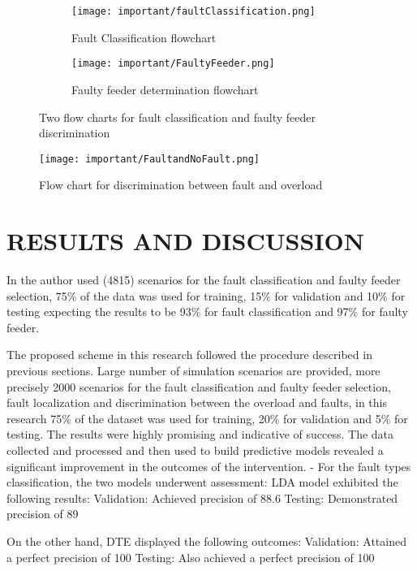 \documentclass[8pt,a4paper,oneside]{elsarticle}
\begin{document}
\begin{figure}[H]
    \centering
    \begin{subfigure}{0.5\linewidth}
        \centering
        \texttt{[image: important/faultClassification.png]}
        \caption{Fault Classification flowchart}
        \label{0_fig:13_faultClassificationFlowChart}
    \end{subfigure}%
    \begin{subfigure}{0.5\linewidth}
        \centering
        \texttt{[image: important/FaultyFeeder.png]}
        \caption{Faulty feeder determination flowchart}
        \label{0_fig:14_faultyFeederDeterminationFlowChart}
    \end{subfigure}
    \caption{Two flow charts for fault classification and faulty feeder discrimination}
\end{figure}
\begin{figure}[H]
    \centering
    \texttt{[image: important/FaultandNoFault.png]}
    \caption{Flow chart for discrimination between fault and overload }
    \label{0_figure:21_faultandNoFaultOverlOad}
\end{figure}
\section{RESULTS AND DISCUSSION}
 In \cite{hubana9066305_10} the author used (4815) scenarios for the fault
classification and faulty feeder selection, 75\% of the data
was used for training, 15\% for validation and 10\% for
testing expecting the results to be 93\% for fault
classification and 97\% for faulty feeder.

 The proposed scheme in this research followed the
procedure described in previous sections. Large number of
simulation scenarios are provided, more precisely 2000
scenarios for the fault classification and faulty feeder
selection, fault localization and discrimination between the overload and faults, in this research 75\% of the dataset was used for training, 20\% for validation and 5\% for testing.
The results were highly promising and indicative of success. The data collected and processed and then used to build predictive models revealed a significant improvement in the outcomes of the intervention. 
- For the fault types classification, the two models underwent assessment:
LDA model exhibited the following results:
Validation: Achieved precision of 88.6%
Testing: Demonstrated precision of 89%

On the other hand, DTE displayed the following outcomes:
Validation: Attained a perfect precision of 100%
Testing: Also achieved a perfect precision of 100%
\end{document}
